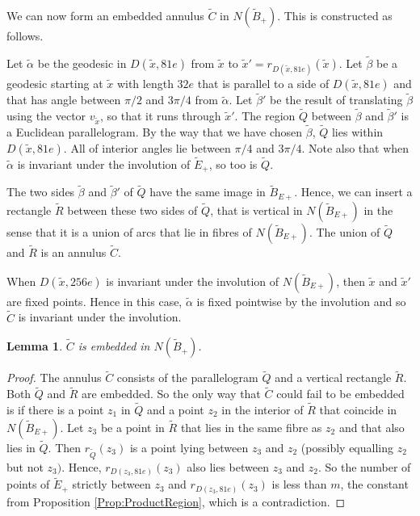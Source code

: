\documentclass[oneside]{amsart}
\numberwithin{equation}{section}
\theoremstyle{plain}
\newtheorem{lemma}[equation]{Lemma}
\theoremstyle{definition}
\begin{document}
We can now form an embedded annulus $\tilde C$ in $N(\tilde B_+)$. This is constructed as follows.

Let $\tilde \alpha$ be the geodesic in $D(\tilde x, 81e)$ from $\tilde x$ to $\tilde x' = r_{D(\tilde x, 81e)}(\tilde x)$. Let $\tilde \beta$ be a geodesic starting
at $\tilde x$ with length $32e$ that is parallel to a side of $D(\tilde x, 81e)$ and that has angle between $\pi/2$ and $3\pi/4$ from $\tilde \alpha$.
Let $\tilde \beta'$ be the result of translating $\tilde \beta$ using the vector $v_{\tilde x}$, so that it runs through $\tilde x'$.
The region $\tilde Q$ between $\tilde \beta$ and $\tilde \beta'$ is 
a Euclidean parallelogram. By the way that we have chosen $\tilde \beta$, $\tilde Q$ lies within $D(\tilde x, 81e)$. All
of interior angles lie between $\pi/4$ and $3\pi/4$. Note also that when $\tilde \alpha$ is invariant under the involution
of $\tilde E_+$, so too is $\tilde Q$.

The two sides $\tilde \beta$ and $\tilde \beta'$ of $\tilde Q$ have the same image in
$\tilde B_{E+}$. Hence, we can insert a rectangle $\tilde R$ between these two sides of $\tilde Q$, that is vertical in $N(\tilde B_{E+})$ in the
sense that it is a union of arcs that lie in fibres of $N(\tilde B_{E+})$. The union of $\tilde Q$ and $\tilde R$ is an annulus $\tilde C$.

When $D(\tilde x, 256e)$ is invariant under the involution of $N(\tilde B_{E+})$, then $\tilde x$ and $\tilde x'$ are fixed points. Hence in this case,
$\tilde \alpha$ is fixed pointwise by the involution and so $\tilde C$ is invariant under the involution.

\begin{lemma}
$\tilde C$ is embedded in $N(\tilde B_+)$.
\end{lemma}

\begin{proof}
The annulus $\tilde C$ consists of the parallelogram $\tilde Q$ and a vertical rectangle $\tilde R$.
Both $\tilde Q$ and $\tilde R$ are embedded. So the only way that $\tilde C$ could fail to be embedded
is if there is a point $z_1$ in $\tilde Q$ and a point $z_2$ in the interior of $\tilde R$ that coincide
in $N(\tilde B_{E+})$. Let $z_3$ be a point in $\tilde R$ that lies in the same fibre as $z_2$ and that also lies in $\tilde Q$.
Then $r_{\tilde Q}(z_3)$ is a point lying between $z_3$ and $z_2$ (possibly equalling $z_2$ but not $z_3)$.
Hence, $r_{D(z_3, 81e)}(z_3)$ also lies between $z_3$ and $z_2$. So the number of points
of $\tilde E_+$ strictly between $z_3$ and  $r_{D(z_3, 81e)}(z_3)$ is less than $m$, the constant from Proposition \ref{Prop:ProductRegion},
which is a contradiction.
\end{proof}
\end{document}
